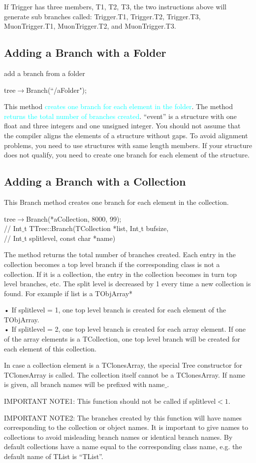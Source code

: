 \documentclass[12pt,a4paper]{article}
\begin{document}
If Trigger has three members, T1, T2, T3, the two instructions above will generate sub branches called: Trigger.T1,
Trigger.T2, Trigger.T3, MuonTrigger.T1, MuonTrigger.T2, and MuonTrigger.T3.

\subsection{Adding a Branch with a Folder}
add a branch from a folder

tree$\rightarrow$Branch(``/aFolder");

This method \textcolor{cyan}{creates one branch for each element in the folder}. The method \textcolor{cyan}{returns the total number of branches created}. ``event” is a structure with one float and three integers and one unsigned integer. You should not assume that the compiler aligns the elements of a structure without gaps. To avoid alignment problems, you need to use structures with same length members. If your structure does not qualify, you need to create one branch for each element of the structure. 


\subsection{Adding a Branch with a Collection}
This Branch method creates one branch for each element in the collection.

tree$\rightarrow$Branch(*aCollection, 8000, 99); \\
// Int$\_$t TTree::Branch(TCollection *list, Int$\_$t bufsize, \\
// Int$\_$t splitlevel, const char *name)

The method returns the total number of branches created. Each entry in the collection becomes a top level branch if the corresponding class is not a collection. If it is a collection, the entry in the collection becomes in turn top level branches, etc. The split level is decreased by 1 every time a new collection is found. For example if list is a TObjArray*

• If splitlevel = 1, one top level branch is created for each element of the TObjArray.\\
• If splitlevel = 2, one top level branch is created for each array element. If one of the array elements is a TCollection, one top level branch will be created for each element of this collection.

In case a collection element is a TClonesArray, the special Tree constructor for TClonesArray is called. The collection itself cannot be a TClonesArray. If name is given, all branch names will be prefixed with name$\_$.

IMPORTANT NOTE1: This function should not be called if splitlevel$<1$. 

IMPORTANT NOTE2: The branches created by this function will have names corresponding to the collection or object names. It is important to give names to collections to avoid misleading branch names or identical branch names. By default collections have a name equal to the corresponding class name, e.g. the default name of TList is ``TList”.
\end{document}
